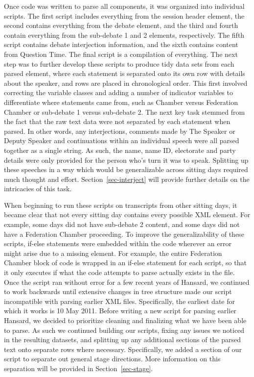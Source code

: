\documentclass[
  letterpaper,
  DIV=11,
  numbers=noendperiod]{scrartcl}
\begin{document}
Once code was written to parse all components, it was organized into
individual scripts. The first script includes everything from the
session header element, the second contains everything from the debate
element, and the third and fourth contain everything from the sub-debate
1 and 2 elements, respectively. The fifth script contains debate
interjection information, and the sixth contains content from Question
Time. The final script is a compilation of everything. The next step was
to further develop these scripts to produce tidy data sets from each
parsed element, where each statement is separated onto its own row with
details about the speaker, and rows are placed in chronological order.
This first involved correcting the variable classes and adding a number
of indicator variables to differentiate where statements came from, such
as Chamber versus Federation Chamber or sub-debate 1 versus sub-debate
2. The next key task stemmed from the fact that the raw text data were
not separated by each statement when parsed. In other words, any
interjections, comments made by The Speaker or Deputy Speaker and
continuations within an individual speech were all parsed together as a
single string. As such, the name, name ID, electorate and party details
were only provided for the person who's turn it was to speak. Splitting
up these speeches in a way which would be generalizable across sitting
days required much thought and effort. Section~\ref{sec-interject} will
provide further details on the intricacies of this task.

When beginning to run these scripts on transcripts from other sitting
days, it became clear that not every sitting day contains every possible
XML element. For example, some days did not have sub-debate 2 content,
and some days did not have a Federation Chamber proceeding. To improve
the generalizability of these scripts, if-else statements were embedded
within the code wherever an error might arise due to a missing element.
For example, the entire Federation Chamber block of code is wrapped in
an if-else statement for each script, so that it only executes if what
the code attempts to parse actually exists in the file. Once the script
ran without error for a few recent years of Hansard, we continued to
work backwards until extensive changes in tree structure made our script
incompatible with parsing earlier XML files. Specifically, the earliest
date for which it works is 10 May 2011. Before writing a new script for
parsing earlier Hansard, we decided to prioritize cleaning and
finalizing what we have been able to parse. As such we continued
building our scripts, fixing any issues we noticed in the resulting
datasets, and splitting up any additional sections of the parsed text
onto separate rows where necessary. Specifically, we added a section of
our script to separate out general stage directions. More information on
this separation will be provided in Section~\ref{sec-stage}.
\end{document}
